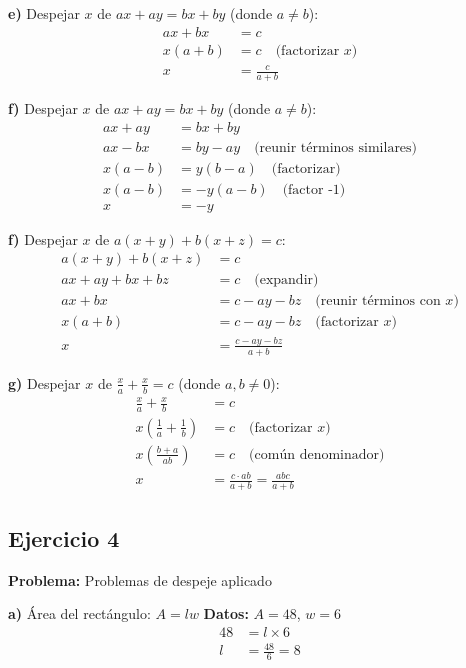 \textbf{e)} Despejar $x$ de $ax + ay = bx + by$ (donde $a \neq b$):
\begin{align}
ax + bx &= c\\
x(a + b) &= c \quad \text{(factorizar $x$)}\\
x &= \frac{c}{a + b}
\end{align}

\textbf{f)} Despejar $x$ de $ax + ay = bx + by$ (donde $a \neq b$):
\begin{align}
ax + ay &= bx + by\\
ax - bx &= by - ay \quad \text{(reunir términos similares)}\\
x(a - b) &= y(b - a) \quad \text{(factorizar)}\\
x(a - b) &= -y(a - b) \quad \text{(factor -1)}\\
x &= -y
\end{align}

\textbf{f)} Despejar $x$ de $a(x + y) + b(x + z) = c$:
\begin{align}
a(x + y) + b(x + z) &= c\\
ax + ay + bx + bz &= c \quad \text{(expandir)}\\
ax + bx &= c - ay - bz \quad \text{(reunir términos con $x$)}\\
x(a + b) &= c - ay - bz \quad \text{(factorizar $x$)}\\
x &= \frac{c - ay - bz}{a + b}
\end{align}

\textbf{g)} Despejar $x$ de $\frac{x}{a} + \frac{x}{b} = c$ (donde $a, b \neq 0$):
\begin{align}
\frac{x}{a} + \frac{x}{b} &= c\\
x\left(\frac{1}{a} + \frac{1}{b}\right) &= c \quad \text{(factorizar $x$)}\\
x\left(\frac{b + a}{ab}\right) &= c \quad \text{(común denominador)}\\
x &= \frac{c \cdot ab}{a + b} = \frac{abc}{a + b}
\end{align}

\subsection*{Ejercicio 4}

\textbf{Problema:} Problemas de despeje aplicado

\textbf{a)} Área del rectángulo: $A = lw$
\textbf{Datos:} $A = 48$, $w = 6$
\begin{align}
48 &= l \times 6\\
l &= \frac{48}{6} = 8
\end{align}

